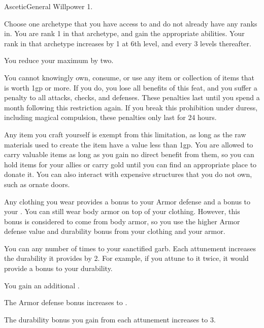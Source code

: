   \begin{feat}{Ascetic}{General}
    \featpre Willpower 1.

     Choose one archetype that you have access to and do not already have any
    ranks in.
    You are rank 1 in that archetype, and gain the appropriate abilities.
    Your rank in that archetype increases by 1 at 6th level, and every 3 levels thereafter.

     You reduce your maximum  by two.

     You cannot knowingly own, consume, or use any item or collection of items that is worth 1gp or more.
    If you do, you lose all benefits of this feat, and you suffer a  penalty to all attacks, checks, and defenses.
    These penalties last until you spend a month following this restriction again.
    If you break this prohibition under duress, including magical compulsion, these penalties only last for 24 hours.

    Any item you craft yourself is exempt from this limitation, as long as the raw materials used to create the item have a value less than 1gp.
    You are allowed to carry valuable items as long as you gain no direct benefit from them, so you can hold items for your allies or carry gold until you can find an appropriate place to donate it.
    You can also interact with expensive structures that you do not own, such as ornate doors.

     Any clothing you wear provides a  bonus to your Armor defense and a  bonus to your .
    You can still wear body armor on top of your clothing.
    However, this bonus is considered to come from body armor, so you use the higher Armor defense value and durability bonus from your clothing and your armor.

    You can  any number of times to your sanctified garb.
    Each attunement increases the durability it provides by 2.
    For example, if you attune to it twice, it would provide a  bonus to your durability.

     You gain an additional .

     The Armor defense bonus increases to .

     The durability bonus you gain from each attunement increases to 3.
  \end{feat}

